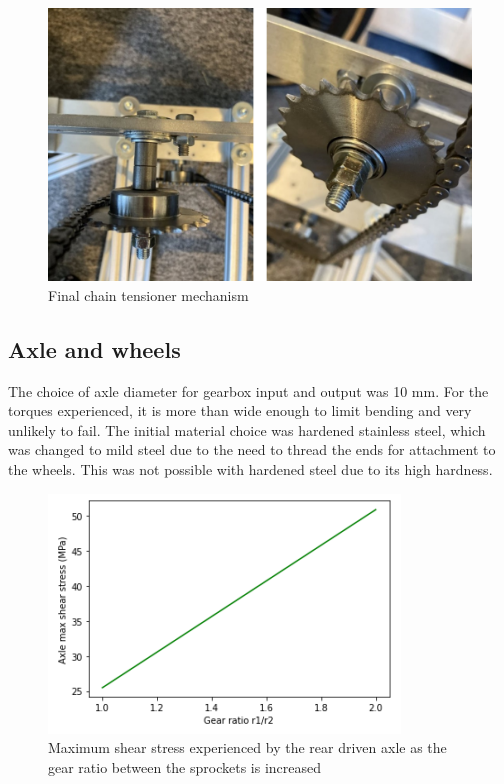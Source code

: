 \begin{figure}[!htbp]
    \centering
    \includegraphics{images/part9/chainTensionerFinal.png}
    \caption{Final chain tensioner mechanism}
    \label{fig:tensionerFinal}
\end{figure}

\subsection{Axle and wheels}

The choice of axle diameter for gearbox input and output was 10 mm. For the torques experienced, it is more than wide enough to limit bending and very unlikely to fail. The initial material choice was hardened stainless steel, which was changed to mild steel due to the need to thread the ends for attachment to the wheels. This was not possible with hardened steel due to its high hardness.

\begin{figure}[!htbp]
    \centering
    \includegraphics{images/part9/axleStress.png}
    \caption{Maximum shear stress experienced by the rear driven axle as the gear ratio between the sprockets is increased}
    \label{fig:axleStress}
\end{figure}

